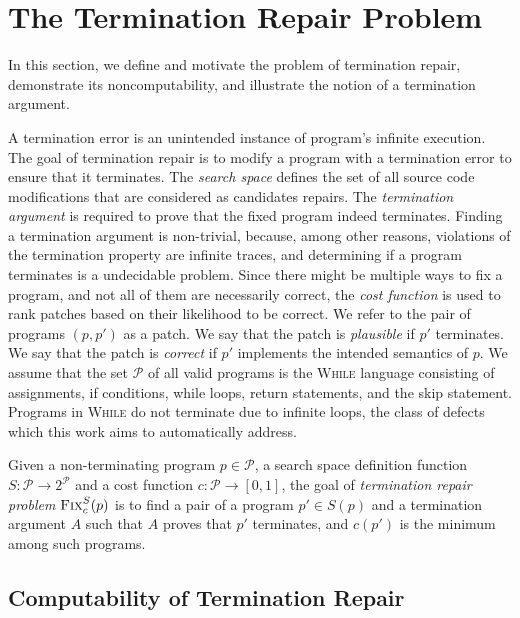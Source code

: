 \section{The Termination Repair Problem}
\label{sec:problem}

In this section, we define and motivate the problem of termination repair, demonstrate its noncomputability, and illustrate the notion of a termination argument.

A termination error is an unintended instance of program's infinite execution. The goal of termination repair is to modify a program with a termination error to ensure that it terminates. The \emph{search space} defines the set of all source code modifications that are considered as candidates repairs. The \emph{termination argument} is required to prove that the fixed program indeed terminates. Finding a termination argument is non-trivial, because, among other reasons, violations of the termination property are infinite traces, and determining if a program terminates is a undecidable problem. Since there might be multiple ways to fix a program, and not all of them are necessarily correct, the \emph{cost function} is used to rank patches based on their likelihood to be correct. We refer to the pair of programs $(p, p')$ as a patch. We say that the patch is \emph{plausible} if $p'$ terminates. We say that the patch is \emph{correct} if $p'$ implements the intended semantics of $p$. We assume that the set $\mathcal{P}$ of all valid programs is the \textsc{While} language consisting of assignments, if conditions, while loops, return statements, and the skip statement. Programs in \textsc{While} do not terminate due to infinite loops, the class of defects which this work aims to automatically address.

\begin{definition}
 Given a non-terminating program $p\in \mathcal{P}$, a search space definition function $S: \mathcal{P} \rightarrow 2^\mathcal{P}$ and a cost function $c: \mathcal{P} \rightarrow [0,1]$, the goal of \emph{termination repair problem} $\textsc{Fix}_c^S(p)$ is to find a pair of a program $p'\in S(p)$ and a termination argument $A$ such that $A$ proves that $p'$ terminates, and $c(p')$ is the minimum among such programs.
\end{definition}

\subsection{Computability of Termination Repair}

